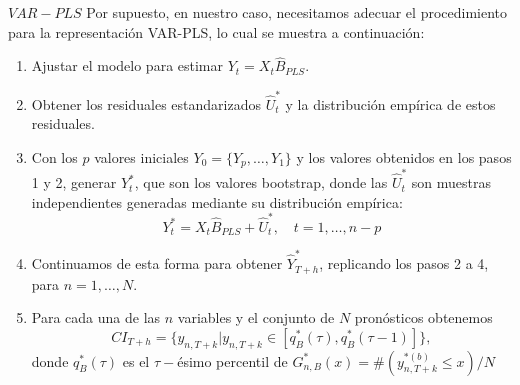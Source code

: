 \documentclass{beamer}
\newcommand{\?}{?`}
\begin{document}
\begin{frame}{$VAR-PLS$}
  Por supuesto, en nuestro caso, necesitamos adecuar el procedimiento
  para la representaci\'on VAR-PLS, lo cual se muestra a continuaci\'on:
  \begin{footnotesize}
  \begin{enumerate}
  \item Ajustar el modelo para estimar $Y_t=X_t\hat{B}_{PLS}$.
  \item Obtener los residuales estandarizados  $\hat{U}_t^{*}$ y la
    distribuci\'on emp\'irica de estos residuales.
  \item Con los $p$ valores iniciales $Y_0=\lbrace Y_p,\ldots,Y_1\rbrace$ y
    los valores obtenidos en los pasos 1 y 2, generar $Y_t^{*}$, que
    son los valores bootstrap, donde las $\hat{U}_t^{*}$ son muestras
    independientes generadas mediante su distribuci\'on emp\'irica:
    \begin{displaymath}
      Y_t^{*}=X_t\hat{B}_{PLS}+\hat{U}_t^{*}, \quad t=1,\ldots,n-p
    \end{displaymath}
  \item Continuamos de esta forma para obtener $\hat{Y}_{T+h}^{*}$,
    replicando los pasos 2 a 4, para $n=1,\ldots,N$.
  \item Para cada una de las $n$ variables y el conjunto de $N$
    pron\'osticos obtenemos
    \begin{displaymath}
      CI_{T+h}=\lbrace y_{n,T+k}|y_{n,T+k} \in
      [q_B^{*}(\tau),q_B^{*}(\tau-1)] \rbrace,
    \end{displaymath}
    donde $q_B^{*}(\tau)$ es el $\tau-$\'esimo percentil de
    $G_{n,B}^{*}(x)=\#\left(y_{n,T+k}^{*(b)}\leq x\right)/N$
  \end{enumerate}
  \end{footnotesize}
\end{frame}
\end{document}
